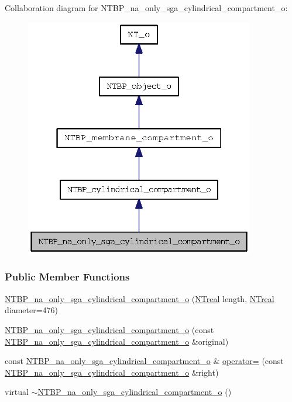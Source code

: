Collaboration diagram for NTBP\_\-na\_\-only\_\-sga\_\-cylindrical\_\-compartment\_\-o:
\nopagebreak
\begin{figure}[H]
\begin{center}
\leavevmode
\includegraphics[width=284pt]{class_n_t_b_p__na__only__sga__cylindrical__compartment__o__coll__graph}
\end{center}
\end{figure}
\subsubsection*{Public Member Functions}
\begin{DoxyCompactItemize}
\item 
\hyperlink{class_n_t_b_p__na__only__sga__cylindrical__compartment__o_a4d8ed467eebc90d88bb737263429e685}{NTBP\_\-na\_\-only\_\-sga\_\-cylindrical\_\-compartment\_\-o} (\hyperlink{nt__types_8h_a814a97893e9deb1eedcc7604529ba80d}{NTreal} length, \hyperlink{nt__types_8h_a814a97893e9deb1eedcc7604529ba80d}{NTreal} diameter=476)
\item 
\hyperlink{class_n_t_b_p__na__only__sga__cylindrical__compartment__o_a8e9c3f2699d1245cbc8ed2c0bb0a07bf}{NTBP\_\-na\_\-only\_\-sga\_\-cylindrical\_\-compartment\_\-o} (const \hyperlink{class_n_t_b_p__na__only__sga__cylindrical__compartment__o}{NTBP\_\-na\_\-only\_\-sga\_\-cylindrical\_\-compartment\_\-o} \&original)
\item 
const \hyperlink{class_n_t_b_p__na__only__sga__cylindrical__compartment__o}{NTBP\_\-na\_\-only\_\-sga\_\-cylindrical\_\-compartment\_\-o} \& \hyperlink{class_n_t_b_p__na__only__sga__cylindrical__compartment__o_a8ca672833fe5e0b3926df3191190c6a6}{operator=} (const \hyperlink{class_n_t_b_p__na__only__sga__cylindrical__compartment__o}{NTBP\_\-na\_\-only\_\-sga\_\-cylindrical\_\-compartment\_\-o} \&right)
\item 
virtual \hyperlink{class_n_t_b_p__na__only__sga__cylindrical__compartment__o_ac4143669c175c3e7fc64f565d10a1390}{$\sim$NTBP\_\-na\_\-only\_\-sga\_\-cylindrical\_\-compartment\_\-o} ()
\end{DoxyCompactItemize}


